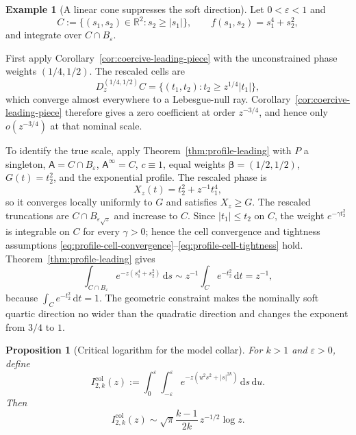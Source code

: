 \documentclass[11pt]{amsart}
\numberwithin{equation}{section}
\newtheorem{proposition}[theorem]{Proposition}
\theoremstyle{definition}
\newtheorem{example}[theorem]{Example}
\theoremstyle{remark}
\newcommand{\R}{\mathbb{R}}
\newcommand{\dd}{\,\mathrm{d}}
\newcommand{\eps}{\varepsilon}
\newcommand{\Afib}{\mathsf{A}}
\begin{document}
\begin{example}[A linear cone suppresses the soft direction]
\label{ex:cone-changes-anisotropy}
Let $0<\eps<1$ and
\[
 C:=\{(s_1,s_2)\in\R^2:s_2\ge|s_1|\},
 \qquad
 f(s_1,s_2)=s_1^4+s_2^2,
\]
and integrate over $C\cap B_\eps$.

First apply Corollary~\ref{cor:coercive-leading-piece} with the unconstrained phase
weights $(1/4,1/2)$.  The rescaled cells are
\[
 D_z^{(1/4,1/2)}C
 =\{(t_1,t_2):t_2\ge z^{1/4}|t_1|\},
\]
which converge almost everywhere to a Lebesgue-null ray.
Corollary~\ref{cor:coercive-leading-piece} therefore gives a zero coefficient at order $z^{-3/4}$, and hence only
$o(z^{-3/4})$ at that nominal scale.

To identify the true scale, apply Theorem~\ref{thm:profile-leading} with
$P$ a singleton,
$\Afib=C\cap B_\eps$, $\Afib^\infty=C$, $c\equiv1$, equal weights
$\bm\beta=(1/2,1/2)$, $G(t)=t_2^2$, and the exponential profile.  The rescaled
phase is
\[
 X_z(t)=t_2^2+z^{-1}t_1^4,
\]
so it converges locally uniformly to $G$ and satisfies $X_z\ge G$.  The
rescaled truncations are $C\cap B_{\eps\sqrt z}$ and increase to $C$.  Since
$|t_1|\le t_2$ on $C$, the weight $e^{-\gamma t_2^2}$ is integrable on $C$
for every $\gamma>0$; hence the cell convergence and tightness assumptions
\eqref{eq:profile-cell-convergence}--\eqref{eq:profile-cell-tightness} hold.
Theorem~\ref{thm:profile-leading} gives
\[
 \int_{C\cap B_\eps}e^{-z(s_1^4+s_2^2)}\dd s
 \sim z^{-1}\int_C e^{-t_2^2}\dd t
 =z^{-1},
\]
because $\int_C e^{-t_2^2}\dd t=1$.
The geometric constraint makes the nominally soft quartic direction no wider
than the quadratic direction and changes the exponent from $3/4$ to $1$.
\end{example}

\begin{proposition}[Critical logarithm for the model collar]
\label{prop:critical-collar-logarithm}
For $k>1$ and $\eps>0$, define
\[
 I^{\mathrm{col}}_{2,k}(z):=\int_0^\eps\int_{-\eps}^{\eps}
 e^{-z(u^2s^2+|s|^{2k})}\dd s\dd u.
\]
Then
\[
 I^{\mathrm{col}}_{2,k}(z)
 \sim \sqrt\pi\frac{k-1}{2k}\,z^{-1/2}\log z.
\]
\end{proposition}
\end{document}
